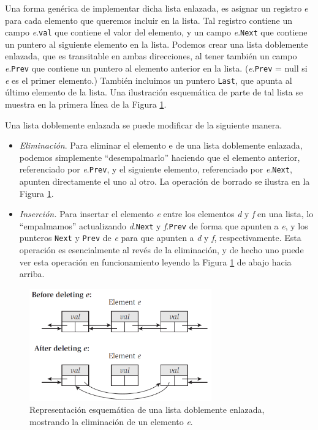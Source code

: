 \documentclass[a4paper, 12pt]{book}
\theoremstyle{dotless}
\begin{document}
Una forma genérica de implementar dicha lista enlazada, es asignar un registro $e$ para cada elemento que queremos incluir en la lista. 
Tal registro contiene un campo \textit{e}.\texttt{val} que contiene el valor del elemento, y un campo \textit{e}.\texttt{Next} que contiene un puntero al siguiente elemento en la lista.
Podemos crear una lista doblemente enlazada, que es transitable en ambas direcciones, al tener también un campo \textit{e}.\texttt{Prev} que contiene un puntero al elemento anterior en la lista. (\textit{e}.\texttt{Prev} = null si \textit{e} es el primer elemento.) 
También incluimos un puntero \texttt{Last}, que apunta al último elemento de la lista. 
Una ilustración esquemática de parte de tal lista se muestra en la primera línea de la Figura \ref{fig:Imagenes-Seccion2/fig2_1.PNG}.

Una lista doblemente enlazada se puede modificar de la siguiente manera.

\begin{itemize}
 \item \textit{Eliminación}. Para eliminar el elemento e de una lista doblemente enlazada, podemos simplemente ``desempalmarlo'' haciendo que el elemento anterior, referenciado por \textit{e}.\texttt{Prev}, y el siguiente elemento, referenciado por \textit{e}.\texttt{Next}, apunten directamente el uno al otro. La operación de borrado se ilustra en la Figura \ref{fig:Imagenes-Seccion2/fig2_1.PNG}.
  \item \textit{Inserción.} Para insertar el elemento \textit{e} entre los elementos \textit{d} y \textit{f} en una lista, lo ``empalmamos'' actualizando \textit{d}.\texttt{Next} y \textit{f}.\texttt{Prev} de forma que apunten a \textit{e}, y los punteros \texttt{Next} y \texttt{Prev} de \textit{e} para que apunten a \textit{d} y \textit{f}, respectivamente. Esta operación es esencialmente al revés de la eliminación, y de hecho uno puede ver esta operación en funcionamiento leyendo la Figura \ref{fig:Imagenes-Seccion2/fig2_1.PNG} de abajo hacia arriba. 
\end{itemize}


\begin{figure}[h] 
  \centering
    \includegraphics[width=0.7\textwidth]{Imagenes-Seccion2/fig2_1.PNG}
    \caption{Representación esquemática de una lista doblemente enlazada, mostrando la eliminación de un elemento \textit{e}.}
    \label{fig:Imagenes-Seccion2/fig2_1.PNG}
\end{figure}
\end{document}
